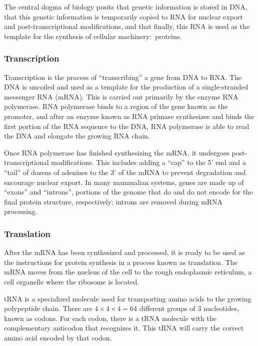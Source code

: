 The central dogma of biology posits that genetic information is stored in DNA, that this genetic information is temporarily copied to RNA for nuclear export and post-transcriptional modifications, and that finally, this RNA is used as the template for the synthesis of cellular machinery: proteins.

\subsubsection{Transcription}

Transcription is the process of ``transcribing'' a gene from DNA to RNA. The DNA is uncoiled and used as a template for the production of a single-stranded messenger RNA (mRNA). This is carried out primarily by the enzyme RNA polymerase. RNA polymerase binds to a region of the gene known as the promoter, and after an enzyme known as RNA primase synthesizes and binds the first portion of the RNA sequence to the DNA, RNA polymerase is able to read the DNA and elongate the growing RNA chain.

Once RNA polymerase has finished synthesizing the mRNA, it undergoes post-transcriptional modifications. This includes adding a ``cap'' to the 5' end and a ``tail'' of dozens of adenines to the 3' of the mRNA to prevent degradation and encourage nuclear export. In many mammalian systems, genes are made up of ``exons'' and ``introns'', portions of the genome that do and do not encode for the final protein structure, respectively; introns are removed during mRNA processing.

\subsubsection{Translation}

After the mRNA has been synthesized and processed, it is ready to be used as the instructions for protein synthesis in a process known as translation. The mRNA moves from the nucleus of the cell to the rough endoplasmic reticulum, a cell organelle where the ribosome is located.

tRNA is a specialized molecule used for transporting amino acids to the growing polypeptide chain. There are \(4\times4\times4=64\) different groups of 3 nucleotides, known as codons. For each codon, there is a tRNA molecule with the complementary anticodon that recognizes it. This tRNA will carry the correct amino acid encoded by that codon.

